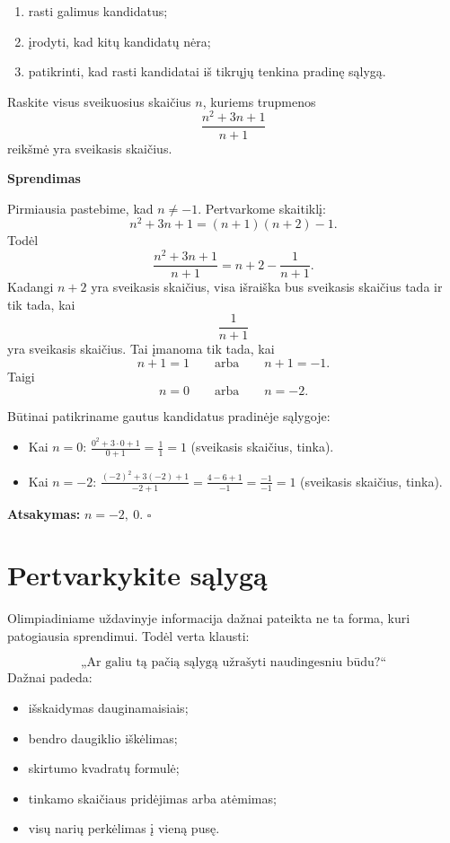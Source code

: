 \documentclass[11pt,a4paper]{scrartcl}
\newenvironment{solution}
    {\begin{list}{}{\setlength{\leftmargin}{10pt}\setlength{\rightmargin}{10pt}}\item[]}
    {\end{list}}
\begin{document}
\begin{enumerate}
    \renewcommand{\labelenumi}{\textbf{\theenumi.}}
    \item rasti galimus kandidatus;
    \item įrodyti, kad kitų kandidatų nėra;
    \item patikrinti, kad rasti kandidatai iš tikrųjų tenkina pradinę sąlygą.
\end{enumerate}

\begin{example}
Raskite visus sveikuosius skaičius $n$, kuriems trupmenos
\[
\frac{n^2+3n+1}{n+1}
\]
reikšmė yra sveikasis skaičius.
\end{example}

\begin{solution}
\textbf{Sprendimas}

Pirmiausia pastebime, kad $n\neq -1$. Pertvarkome skaitiklį:
\[
n^2+3n+1=(n+1)(n+2)-1.
\]
Todėl
\[
\frac{n^2+3n+1}{n+1} = n+2-\frac{1}{n+1}.
\]
Kadangi $n+2$ yra sveikasis skaičius, visa išraiška bus sveikasis
skaičius tada ir tik tada, kai
\[
\frac{1}{n+1}
\]
yra sveikasis skaičius. Tai įmanoma tik tada, kai
\[
n+1=1 \qquad\text{arba}\qquad n+1=-1.
\]
Taigi
\[
n=0 \qquad\text{arba}\qquad n=-2.
\]

Būtinai patikriname gautus kandidatus pradinėje sąlygoje:
\begin{itemize}
    \item Kai $n=0$: $\frac{0^2+3\cdot 0+1}{0+1} = \frac{1}{1} = 1$ (sveikasis skaičius, tinka).
    \item Kai $n=-2$: $\frac{(-2)^2+3(-2)+1}{-2+1} = \frac{4-6+1}{-1} = \frac{-1}{-1} = 1$ (sveikasis skaičius, tinka).
\end{itemize}

\textbf{Atsakymas:} $\boxed{n=-2,\ 0}$. \hfill $\square$
\end{solution}

\section{Pertvarkykite sąlygą}

Olimpiadiniame uždavinyje informacija dažnai pateikta ne ta forma, kuri
patogiausia sprendimui. Todėl verta klausti:

\[
\text{„Ar galiu tą pačią sąlygą užrašyti naudingesniu būdu?“}
\]
Dažnai padeda:

\begin{itemize}
    \item išskaidymas dauginamaisiais;
    \item bendro daugiklio iškėlimas;
    \item skirtumo kvadratų formulė;
    \item tinkamo skaičiaus pridėjimas arba atėmimas;
    \item visų narių perkėlimas į vieną pusę.
\end{itemize}
\end{document}
